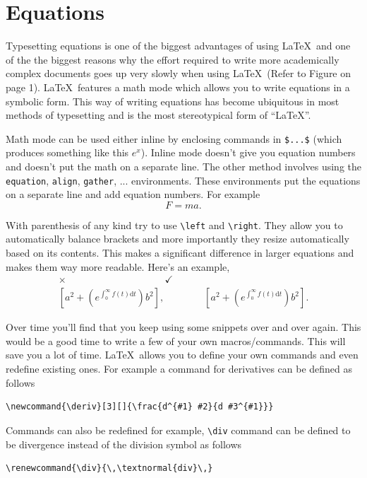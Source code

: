 \section{Equations}\label{sec:equations}
Typesetting equations is one of the biggest advantages of using \LaTeX\ and one of the the biggest reasons why the effort required to write more academically complex documents goes up very slowly when using \LaTeX\ (Refer to Figure on page 1). \LaTeX\ features a math mode which allows you to write equations in a symbolic form. This way of writing equations has become ubiquitous in most methods of typesetting and is the most stereotypical form of ``\LaTeX''.

Math mode can be used either inline by enclosing commands in \verb*|$...$| (which produces something like this $e^x$). Inline mode doesn't give you equation numbers and doesn't put the math on a separate line. The other method involves using the \texttt{equation}, \texttt{align}, \texttt{gather}, ... environments. These environments put the equations on a separate line and add equation numbers. For example
\begin{equation}
	F = ma.
\end{equation}

With parenthesis of any kind try to use \lstinline|\left| and \lstinline|\right|. They allow you to automatically balance brackets and more importantly they resize automatically based on its contents. This makes a significant difference in larger equations and makes them way more readable. Here's an example,
\begin{gather}
	\bm{\times} \qquad\qquad\qquad\qquad\qquad \checkmark \nonumber\\
	[a^2 + (e^{\int_0^{\infty} f(t) \text{d}t})b^2] ,\qquad\qquad  \left[a^2 + \left(e^{\int_0^{\infty} f\left(t\right) \text{d}t}\right)b^2\right].
\end{gather}

Over time you'll find that you keep using some snippets over and over again. This would be a good time to write a few of your own macros/commands. This will save you a lot of time. \LaTeX\ allows you to define your own commands and even redefine existing ones. For example a command for derivatives can be defined as follows
\begin{lstlisting}[style=mystyle]
\newcommand{\deriv}[3][]{\frac{d^{#1} #2}{d #3^{#1}}}\end{lstlisting}
Commands can also be redefined for example, \lstinline[style=mystyle]|\div| command can be defined to be divergence instead of the division symbol as follows
\begin{lstlisting}[style=mystyle]
\renewcommand{\div}{\,\textnormal{div}\,}\end{lstlisting}

